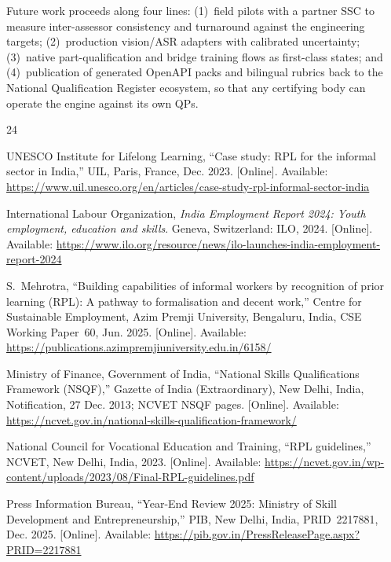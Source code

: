 \documentclass[conference]{IEEEtran}
\begin{document}
Future work proceeds along four lines: (1)~field pilots with a partner SSC to measure
inter-assessor consistency and turnaround against the engineering targets; (2)~production
vision/ASR adapters with calibrated uncertainty; (3)~native part-qualification and bridge
training flows as first-class states; and (4)~publication of generated OpenAPI packs and
bilingual rubrics back to the National Qualification Register ecosystem, so that any
certifying body can operate the engine against its own QPs.

\begin{thebibliography}{24}
\setlength{\itemsep}{1pt}
\setlength{\parsep}{0pt}

UNESCO Institute for Lifelong Learning, ``Case study: RPL for the informal sector in
India,'' UIL, Paris, France, Dec. 2023. [Online]. Available:
\url{https://www.uil.unesco.org/en/articles/case-study-rpl-informal-sector-india}

International Labour Organization, \emph{India Employment Report 2024: Youth employment,
education and skills}. Geneva, Switzerland: ILO, 2024. [Online]. Available:
\url{https://www.ilo.org/resource/news/ilo-launches-india-employment-report-2024}

S.~Mehrotra, ``Building capabilities of informal workers by recognition of prior learning
(RPL): A pathway to formalisation and decent work,'' Centre for Sustainable Employment,
Azim Premji University, Bengaluru, India, CSE Working Paper~60, Jun. 2025. [Online].
Available: \url{https://publications.azimpremjiuniversity.edu.in/6158/}

Ministry of Finance, Government of India, ``National Skills Qualifications Framework
(NSQF),'' Gazette of India (Extraordinary), New Delhi, India, Notification, 27 Dec. 2013;
NCVET NSQF pages. [Online]. Available:
\url{https://ncvet.gov.in/national-skills-qualification-framework/}

National Council for Vocational Education and Training, ``RPL guidelines,'' NCVET, New
Delhi, India, 2023. [Online]. Available:
\url{https://ncvet.gov.in/wp-content/uploads/2023/08/Final-RPL-guidelines.pdf}

Press Information Bureau, ``Year-End Review 2025: Ministry of Skill Development and
Entrepreneurship,'' PIB, New Delhi, India, PRID~2217881, Dec. 2025. [Online]. Available:
\url{https://pib.gov.in/PressReleasePage.aspx?PRID=2217881}


\end{thebibliography}
\end{document}
